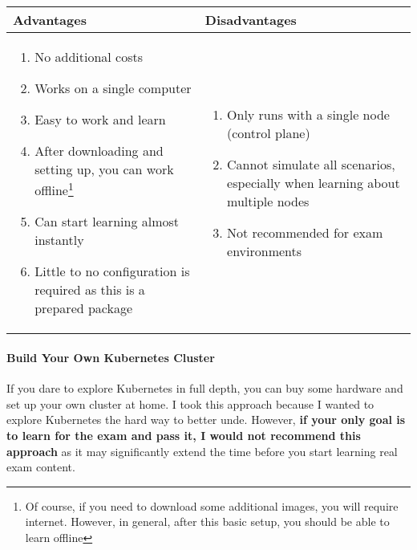\begin{tabularx}{\textwidth}{|X|X|}
	\hline
	\cellcolor{DarkOliveGreen2}\textbf{Advantages} & \cellcolor{Tomato1}\textbf{Disadvantages} \\
	\hline
	\begin{enumerate}
		\item No additional costs
		\item Works on a single computer
		\item Easy to work and learn
		\item After downloading and setting up, you can work offline\footnote{Of course, if you need to download some additional images, you will require internet. However, in general, after this basic setup, you should be able to learn offline}
		\item Can start learning almost instantly
		\item Little to no configuration is required as this is a prepared package
	\end{enumerate}
	
	&
	
	\begin{enumerate}
		\item Only runs with a single node (control plane)
		\item Cannot simulate all scenarios, especially when learning about multiple nodes
		\item Not recommended for exam environments
	\end{enumerate}\\
	\hline
\end{tabularx}

\paragraph{Build Your Own Kubernetes Cluster}
If you dare to explore Kubernetes in full depth, you can buy some hardware and set up your own cluster at home. I took this approach because I wanted to explore Kubernetes the hard way to better unde. However, \textbf{if your only goal is to learn for the exam and pass it, I would not recommend this approach} as it may significantly extend the time before you start learning real exam content.\\

